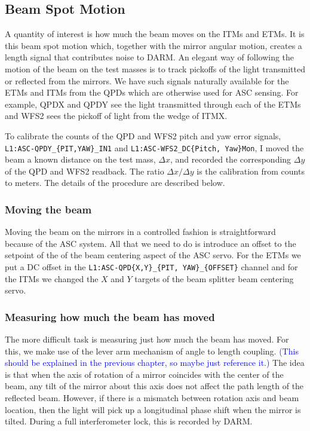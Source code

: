 \subsection{Beam Spot Motion}
A quantity of interest is how much the beam moves on the ITMs and
ETMs. It is this beam spot motion which, together with the mirror
angular motion, creates a length signal that contributes noise to
DARM. An elegant way of following the motion of the beam on the test
masses is to track pickoffs of the light transmitted or reflected from
the mirrors. We have such signals naturally available for the ETMs and
ITMs from the QPDs which are otherwise used for ASC sensing. For
example, QPDX and QPDY see the light transmitted through each of the
ETMs and WFS2 sees the pickoff of light from the wedge of ITMX.

To calibrate the counts of the QPD and WFS2 pitch and yaw error
signals, \linebreak \texttt{L1:ASC-QPDY\_\{PIT,YAW\}\_IN1} and
\texttt{L1:ASC-WFS2\_DC\{Pitch, Yaw\}Mon}, I moved the beam a
known distance on the test mass, $\Delta x$, and recorded the
corresponding $\Delta y$ of the QPD and WFS2 readback. The ratio
$\Delta x /\Delta y$ is the calibration from counts to meters. The
details of the procedure are described below.


\subsubsection{Moving the beam} 
Moving the beam on the mirrors in a controlled fashion is
straightforward because of the ASC system. All that we need to do is
introduce an offset to the setpoint of the of the beam centering
aspect of the ASC servo. For the ETMs we put a DC offset in the
\texttt{L1:ASC-QPD\{X,Y\}\_\{PIT, YAW\}\_\{OFFSET\}} channel and for
the ITMs we changed the $X$ and $Y$ targets of the beam splitter beam
centering servo.

\subsubsection{Measuring how much the beam has moved} 
The more difficult task is measuring just how much the beam has
moved. For this, we make use of the lever arm mechanism of angle to
length coupling. \textcolor{blue}{(This should be explained in the
  previous chapter, so maybe just reference it.)} The idea is that
when the axis of rotation of a mirror coincides with the center of the
beam, any tilt of the mirror about this axis does not affect the path
length of the reflected beam. However, if there is a mismatch between
rotation axis and beam location, then the light will pick up a
longitudinal phase shift when the mirror is tilted. During a full
interferometer lock, this is recorded by DARM.

